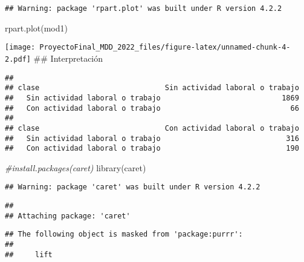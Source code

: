 \documentclass[
]{article}
\newenvironment{Shaded}{\begin{snugshade}}{\end{snugshade}}
\newcommand{\AttributeTok}[1]{\textcolor[rgb]{0.77,0.63,0.00}{#1}}
\newcommand{\CommentTok}[1]{\textcolor[rgb]{0.56,0.35,0.01}{\textit{#1}}}
\newcommand{\FunctionTok}[1]{\textcolor[rgb]{0.00,0.00,0.00}{#1}}
\newcommand{\NormalTok}[1]{#1}
\newcommand{\OtherTok}[1]{\textcolor[rgb]{0.56,0.35,0.01}{#1}}
\newcommand{\SpecialCharTok}[1]{\textcolor[rgb]{0.00,0.00,0.00}{#1}}
\newcommand{\StringTok}[1]{\textcolor[rgb]{0.31,0.60,0.02}{#1}}
\begin{document}
\begin{verbatim}
## Warning: package 'rpart.plot' was built under R version 4.2.2
\end{verbatim}

\begin{Shaded}
\begin{Highlighting}[]
\FunctionTok{rpart.plot}\NormalTok{(mod1)}
\end{Highlighting}
\end{Shaded}

\texttt{[image: ProyectoFinal\_MDD\_2022\_files/figure-latex/unnamed-chunk-4-2.pdf]}
\#\# Interpretación

\begin{Shaded}
\end{Shaded}

\begin{verbatim}
##                                  
## clase                             Sin actividad laboral o trabajo
##   Sin actividad laboral o trabajo                            1869
##   Con actividad laboral o trabajo                              66
##                                  
## clase                             Con actividad laboral o trabajo
##   Sin actividad laboral o trabajo                             316
##   Con actividad laboral o trabajo                             190
\end{verbatim}

\begin{Shaded}
\begin{Highlighting}[]
\CommentTok{\#install.packages(\textquotesingle{}caret\textquotesingle{})}
\FunctionTok{library}\NormalTok{(caret)}
\end{Highlighting}
\end{Shaded}

\begin{verbatim}
## Warning: package 'caret' was built under R version 4.2.2
\end{verbatim}

\begin{verbatim}
## 
## Attaching package: 'caret'
\end{verbatim}

\begin{verbatim}
## The following object is masked from 'package:purrr':
## 
##     lift
\end{verbatim}
\end{document}
